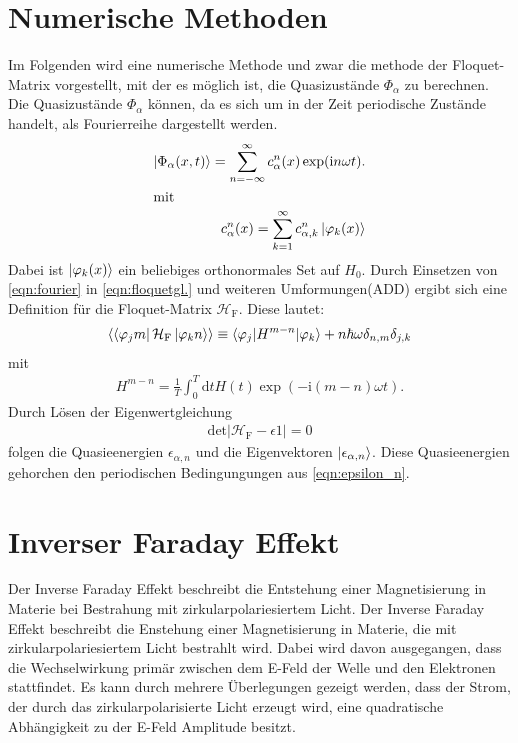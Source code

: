 \section{Numerische Methoden}
Im Folgenden wird eine numerische Methode und zwar die methode der Floquet-Matrix vorgestellt, mit der es möglich ist,
die Quasizustände $\Phi_\alpha$ zu berechnen.
Die Quasizustände $\Phi_\alpha$ können, da es sich um in der Zeit periodische Zustände handelt,
als Fourierreihe dargestellt werden.
\begin{align}
  \ket{\Phi_{\alpha}(x,t)}=\sum_{n=-\infty}^{\infty} c_{\alpha}^n (x) \label{eqn:fourier}
  \exp(\mathrm{i}n\omega t).\\
\intertext{mit}
 c_\alpha^n(x)=\sum_{k=1}^\infty c_{\alpha,k}^n \ket{\varphi_k(x)} %
\end{align}
Dabei ist $\ket{\varphi_k(x)}$ ein beliebiges orthonormales Set auf $H_0$.
Durch Einsetzen von \eqref{eqn:fourier} in \eqref{eqn:floquetgl.}
und weiteren Umformungen(ADD) ergibt sich eine Definition für die Floquet-Matrix $\mathcal{H}_\mathrm{F}$.
Diese lautet:
\begin{align}
  \braket{\bra{\varphi_j m}\mathcal{H}_\mathrm{F}\ket{\varphi_k n}}\equiv \braket{\varphi_j|H^{m-n}|\varphi_k} + n\hbar \omega \delta_{n,m}\delta_{j,k}
\end{align}
mit
\begin{align}
H^{m-n}=\frac{1}{T}\int_0^T \mathrm{d}t H(t) \exp\left(-\mathrm{i}(m-n)\omega t\right).
\end{align}
Durch Lösen der Eigenwertgleichung
\begin{align}
  \mathrm{det}|\mathcal{H}_\mathrm{F}-\epsilon\mathcal{1}|=0
\end{align}
folgen die Quasieenergien $\epsilon_{\alpha,n}$ und die Eigenvektoren $\ket{\epsilon_{\alpha,n}}$.
Diese Quasieenergien gehorchen den periodischen Bedingungungen aus \eqref{eqn:epsilon_n}.


\section{Inverser Faraday Effekt}
Der Inverse Faraday Effekt beschreibt die Entstehung einer Magnetisierung in Materie bei Bestrahung mit zirkularpolariesiertem Licht.
Der Inverse Faraday Effekt beschreibt die Enstehung einer Magnetisierung in Materie, die mit zirkularpolariesiertem Licht bestrahlt wird.
Dabei wird davon ausgegangen, dass die Wechselwirkung primär zwischen dem E-Feld der Welle und den Elektronen stattfindet.
Es kann durch mehrere Überlegungen gezeigt werden, dass der Strom, der durch das zirkularpolarisierte Licht erzeugt wird, eine quadratische Abhängigkeit
zu der E-Feld Amplitude besitzt.
